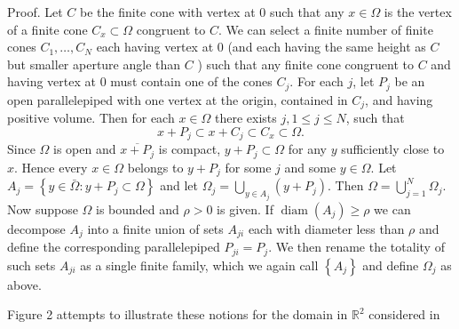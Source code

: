 Proof. Let $C$ be the finite cone with vertex at 0 such that any $x \in \Omega$ is the vertex of a finite cone $C_x \subset \Omega$ congruent to $C$. We can select a finite number of finite cones $C_1, \ldots, C_N$ each having vertex at 0 (and each having the same height as $C$ but smaller aperture angle than $C$ ) such that any finite cone congruent to $C$ and having vertex at 0 must contain one of the cones $C_j$. For each $j$, let $P_j$ be an open parallelepiped with one vertex at the origin, contained in $C_j$, and having positive volume. Then for each $x \in \Omega$ there exists $j, 1 \leq j \leq N$, such that
\[
x+P_j \subset x+C_j \subset C_x \subset \Omega .
\]
Since $\Omega$ is open and $\overline{x+P_j}$ is compact, $y+P_j \subset \Omega$ for any $y$ sufficiently close to $x$. Hence every $x \in \Omega$ belongs to $y+P_j$ for some $j$ and some $y \in \Omega$. Let $A_j=\left\{y \in \bar{\Omega}: y+P_j \subset \Omega\right\}$ and let $\Omega_j=\bigcup_{y \in A_j}\left(y+P_j\right)$. Then $\Omega=\bigcup_{j=1}^N \Omega_j$. Now suppose $\Omega$ is bounded and $\rho>0$ is given. If $\operatorname{diam}\left(A_j\right) \geq \rho$ we can decompose $A_j$ into a finite union of sets $A_{j i}$ each with diameter less than $\rho$ and define the corresponding parallelepiped $P_{j i}=P_j$. We then rename the totality of such sets $A_{j i}$ as a single finite family, which we again call $\left\{A_j\right\}$ and define $\Omega_j$ as above.

Figure 2 attempts to illustrate these notions for the domain in $\mathbb{R}^2$ considered in